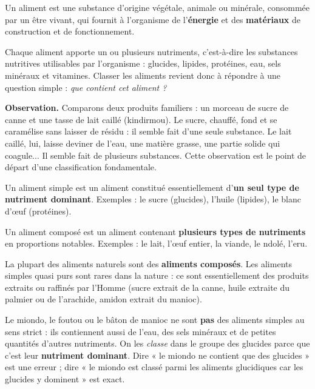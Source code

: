 \documentclass[11pt]{article}
\newcommand{\cle}[1]{{\popxbold\color{popdark}#1}}
\newcounter{popsec}
\newcounter{popsub}
\newcommand{\courssub}[1]{%
  \stepcounter{popsub}%
  \par\vspace{9pt}\noindent{\popxbold\fontsize{11.5}{13}\selectfont\color{popink}{\color{poporange}\thepopsec.\thepopsub}\hspace{6pt}#1}\par\nopagebreak\vspace{4pt}
}
\begin{document}
\begin{definition}[Aliment]
Un \cle{aliment} est une substance d'origine végétale, animale ou minérale, consommée par un être vivant, qui fournit à l'organisme de l'\textbf{énergie} et des \textbf{matériaux} de construction et de fonctionnement.
\end{definition}

Chaque aliment apporte un ou plusieurs \cle{nutriments}, c'est-à-dire les substances nutritives utilisables par l'organisme : glucides, lipides, protéines, eau, sels minéraux et vitamines. Classer les aliments revient donc à répondre à une question simple : \emph{que contient cet aliment ?}

\courssub{Aliments simples et aliments composés}

\textbf{Observation.} Comparons deux produits familiers : un morceau de sucre de canne et une tasse de lait caillé (kindirmou). Le sucre, chauffé, fond et se caramélise sans laisser de résidu : il semble fait d'une seule substance. Le lait caillé, lui, laisse deviner de l'eau, une matière grasse, une partie solide qui coagule... Il semble fait de plusieurs substances. Cette observation est le point de départ d'une classification fondamentale.

\begin{definition}
Un \cle{aliment simple} est un aliment constitué essentiellement d'\textbf{un seul type de nutriment dominant}. Exemples : le sucre (glucides), l'huile (lipides), le blanc d'œuf (protéines).\par
Un \cle{aliment composé} est un aliment contenant \textbf{plusieurs types de nutriments} en proportions notables. Exemples : le lait, l'œuf entier, la viande, le ndolé, l'eru.
\end{definition}

\begin{propriete}[Admise]
La plupart des aliments naturels sont des \textbf{aliments composés}. Les aliments simples quasi purs sont rares dans la nature : ce sont essentiellement des produits extraits ou raffinés par l'Homme (sucre extrait de la canne, huile extraite du palmier ou de l'arachide, amidon extrait du manioc).
\end{propriete}

\begin{attention}
Le miondo, le foutou ou le bâton de manioc ne sont \textbf{pas} des aliments simples au sens strict : ils contiennent aussi de l'eau, des sels minéraux et de petites quantités d'autres nutriments. On les \emph{classe} dans le groupe des glucides parce que c'est leur \textbf{nutriment dominant}. Dire « le miondo ne contient que des glucides » est une erreur ; dire « le miondo est classé parmi les aliments glucidiques car les glucides y dominent » est exact.
\end{attention}
\end{document}
